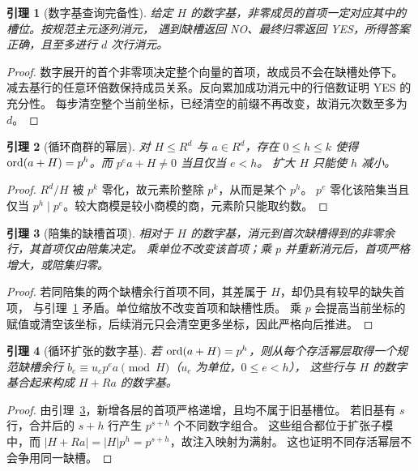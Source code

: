 \documentclass[11pt,a4paper,fontset=fandol]{ctexart}
\theoremstyle{definition}
\theoremstyle{plain}
\newtheorem{lemma}{引理}
\begin{document}
\begin{lemma}[数字基查询完备性]\label{lem:query}
给定 $H$ 的数字基，非零成员的首项一定对应其中的槽位。按规范主元逐列消元，
遇到缺槽返回 NO、最终归零返回 YES，所得答案正确，且至多进行 $d$ 次行消元。
\end{lemma}
\begin{proof}
数字展开的首个非零项决定整个向量的首项，故成员不会在缺槽处停下。
减去基行的任意环倍数保持成员关系。反向累加成功消元中的行倍数证明 YES 的充分性。
每步清空整个当前坐标，已经清空的前缀不再改变，故消元次数至多为 $d$。
\end{proof}

\begin{lemma}[循环商群的幂层]\label{lem:order}
对 $H\le R^d$ 与 $a\in R^d$，存在 $0\le h\le k$ 使得
$\operatorname{ord}(a+H)=p^h$。而 $p^e a+H\ne0$ 当且仅当 $e<h$。
扩大 $H$ 只能使 $h$ 减小。
\end{lemma}
\begin{proof}
$R^d/H$ 被 $p^k$ 零化，故元素阶整除 $p^k$，从而是某个 $p^h$。
$p^e$ 零化该陪集当且仅当 $p^h\mid p^e$。较大商模是较小商模的商，元素阶只能取约数。
\end{proof}

\begin{lemma}[陪集的缺槽首项]\label{lem:coset}
相对于 $H$ 的数字基，消元到首次缺槽得到的非零余行，其首项仅由陪集决定。
乘单位不改变该首项；乘 $p$ 并重新消元后，首项严格增大，或陪集归零。
\end{lemma}
\begin{proof}
若同陪集的两个缺槽余行首项不同，其差属于 $H$，却仍具有较早的缺失首项，
与引理~\ref{lem:query} 矛盾。单位缩放不改变首项和缺槽性质。
乘 $p$ 会提高当前坐标的赋值或清空该坐标，后续消元只会清空更多坐标，因此严格向后推进。
\end{proof}

\begin{lemma}[循环扩张的数字基]\label{lem:extension}
若 $\operatorname{ord}(a+H)=p^h$，则从每个存活幂层取得一个规范缺槽余行
$b_e\equiv u_e p^e a\pmod H$（$u_e$ 为单位，$0\le e<h$），
这些行与 $H$ 的数字基合起来构成 $H+Ra$ 的数字基。
\end{lemma}
\begin{proof}
由引理~\ref{lem:coset}，新增各层的首项严格递增，且均不属于旧基槽位。
若旧基有 $s$ 行，合并后的 $s+h$ 行产生 $p^{s+h}$ 个不同数字组合。
这些组合都位于扩张子模中，而 $|H+Ra|=|H|p^h=p^{s+h}$，故注入映射为满射。
这也证明不同存活幂层不会争用同一缺槽。
\end{proof}
\end{document}
